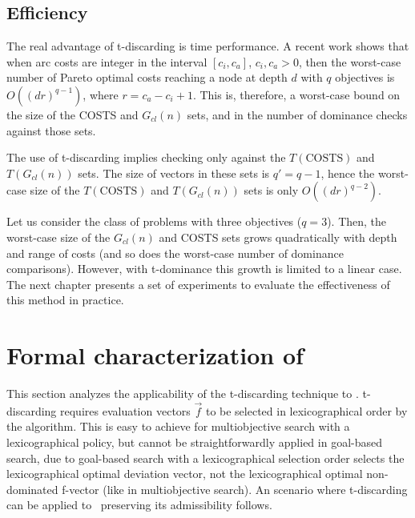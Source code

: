 \subsection{Efficiency}
\label{chapFormalAnalysis:sec:efficiencyNamoate}

The real advantage of t-discarding is time performance. A recent work \citep{Mandow2009} shows that when arc costs are integer in the interval $[c_i,c_a]$, $c_i,c_a > 0$, then the worst-case number of Pareto optimal costs reaching a node at depth $d$ with $q$ objectives is $O((dr)^{q-1})$, where $r= c_a - c_i + 1$. This is, therefore, a worst-case bound on the size of the COSTS and $G_{cl}(n)$ sets, and in the number of dominance checks against those sets.

The use of t-discarding implies checking only against the $T(\text{COSTS})$ and $T(G_{cl}(n))$ sets. The size of vectors in these sets is $q' = q - 1$, hence the worst-case size of the $T(\text{COSTS})$ and $T(G_{cl}(n))$ sets is only $O((dr)^{q-2})$.

Let us consider the class of problems with three objectives ($q=3$). Then, the worst-case size of the $G_{cl}(n)$ and COSTS sets grows quadratically with depth and range of costs (and so does the worst-case number of dominance comparisons). However, with t-dominance this growth is limited to a linear case. The next chapter presents a set of experiments to evaluate the effectiveness of this method in practice.

\section{Formal characterization of \texorpdfstring{\lexgote}{LEXGO*te}}
\label{chapFormalAnalysis:sec:analysisLexgote}

This section analyzes the applicability of the t-discarding technique to \lexgo. t-discarding requires evaluation vectors $\vec f$ to be selected in lexicographical order by the algorithm. This is easy to achieve for multiobjective search with a lexicographical policy, but cannot be straightforwardly applied in goal-based search, due to goal-based search with a lexicographical selection order selects the lexicographical optimal deviation vector, not the lexicographical optimal non-dominated f-vector (like in multiobjective search). An scenario where t-discarding can be applied to \lexgo \ preserving its admissibility follows.


